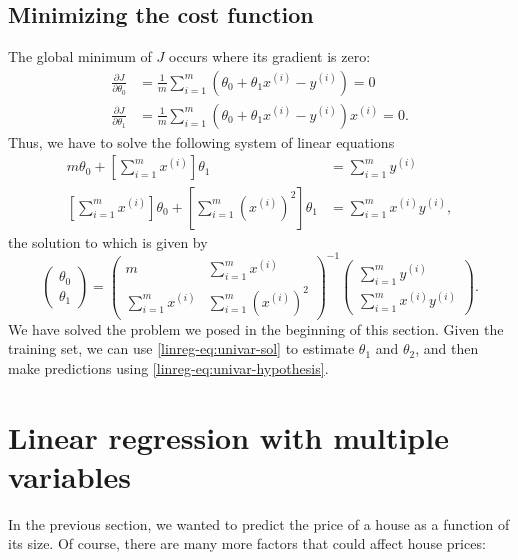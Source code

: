 \documentclass{article}
\theoremstyle{definition}
\begin{document}
\subsection{Minimizing the cost function}
The global minimum of $J$ occurs where its gradient is zero:
\begin{align*}
    \frac{\partial J}{\partial\theta_0} &= \frac{1}{m}\sum_{i=1}^{m}(\theta_0 + \theta_1 x^{(i)} - y^{(i)}) = 0 \\
    \frac{\partial J}{\partial\theta_1} &= \frac{1}{m}\sum_{i=1}^{m}(\theta_0 + \theta_1 x^{(i)} - y^{(i)})x^{(i)} = 0.
\end{align*}
Thus, we have to solve the following system of linear equations
\begin{align*}
    m \theta_0 + \left[\sum_{i=1}^{m}x^{(i)}\right]\theta_1 &= \sum_{i=1}^{m} y^{(i)}\\
    \left[\sum_{i=1}^{m}x^{(i)}\right] \theta_0 + \left[\sum_{i=1}^{m}\left(x^{(i)}\right)^2\right]\theta_1 &= \sum_{i=1}^{m} x^{(i)}y^{(i)},
\end{align*}
the solution to which is given by
\begin{equation}
\begin{pmatrix}
\theta_0\\
\theta_1
\end{pmatrix}
=
\begin{pmatrix}
m & \sum_{i=1}^{m}x^{(i)}\\
\sum_{i=1}^{m}x^{(i)} & \sum_{i=1}^{m}\left(x^{(i)}\right)^2
\end{pmatrix}^{-1}
\begin{pmatrix}
\sum_{i=1}^{m}y^{(i)}\\
\sum_{i=1}^{m}x^{(i)}y^{(i)}
\end{pmatrix}.
\label{linreg-eq:univar-sol}
\end{equation}
We have solved the problem we posed in the beginning of this section. Given the training set, we can use \eqref{linreg-eq:univar-sol} to estimate $\theta_1$ and $\theta_2$, and then make predictions using \eqref{linreg-eq:univar-hypothesis}.


\newpage
\section{Linear regression with multiple variables}
In the previous section, we wanted to predict the price of a house as a function of its size. Of course, there are many more factors that could affect house prices:
\end{document}
